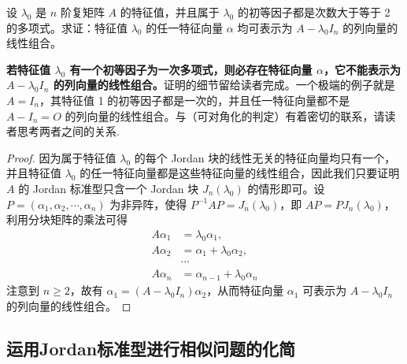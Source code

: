 \documentclass[../../main.tex]{subfiles}
\begin{document}
\begin{proposition}\label{proposition:列向量的线性组合}
设 $\lambda_0$ 是 $n$ 阶复矩阵 $A$ 的特征值，并且属于 $\lambda_0$ 的初等因子都是次数大于等于 2 的多项式。求证：特征值 $\lambda_0$ 的任一特征向量 $\alpha$ 均可表示为 $A - \lambda_0I_n$ 的列向量的线性组合。
\end{proposition}
\begin{remark}
\textbf{若特征值 $\lambda_0$ 有一个初等因子为一次多项式，则必存在特征向量 $\alpha$，它不能表示为 $A - \lambda_0I_n$ 的列向量的线性组合。}证明的细节留给读者完成。一个极端的例子就是 $A = I_n$，其特征值 1 的初等因子都是一次的，并且任一特征向量都不是 $A - I_n = O$ 的列向量的线性组合。与（可对角化的判定）有着密切的联系，请读者思考两者之间的关系.
\end{remark}
\begin{proof}
因为属于特征值 $\lambda_0$ 的每个 Jordan 块的线性无关的特征向量均只有一个，并且特征值 $\lambda_0$ 的任一特征向量都是这些特征向量的线性组合，因此我们只要证明 $A$ 的 Jordan 标准型只含一个 Jordan 块 $J_n(\lambda_0)$ 的情形即可。设 $P = (\alpha_1,\alpha_2,\cdots,\alpha_n)$ 为非异阵，使得 $P^{-1}AP = J_n(\lambda_0)$，即 $AP = PJ_n(\lambda_0)$，利用分块矩阵的乘法可得
\begin{align*}
A\alpha_1 &= \lambda_0\alpha_1,\\
A\alpha_2 &= \alpha_1 + \lambda_0\alpha_2,\\
&\cdots\\
A\alpha_n &= \alpha_{n - 1} + \lambda_0\alpha_n
\end{align*}
注意到 $n \geqslant  2$，故有 $\alpha_1 = (A - \lambda_0I_n)\alpha_2$，从而特征向量 $\alpha_1$ 可表示为 $A - \lambda_0I_n$ 的列向量的线性组合。

\end{proof}



\subsection{运用Jordan标准型进行相似问题的化简}
\end{document}

